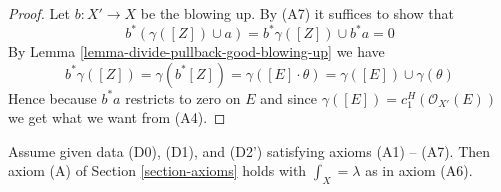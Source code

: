 \begin{proof}
Let $b : X' \to X$ be the blowing up. By (A7) it suffices to show
that
$$
b^*(\gamma([Z]) \cup a) = b^*\gamma([Z]) \cup b^*a = 0
$$
By Lemma \ref{lemma-divide-pullback-good-blowing-up} we have
$$
b^*\gamma([Z]) = \gamma(b^*[Z]) =
\gamma([E] \cdot \theta) =
\gamma([E]) \cup \gamma(\theta)
$$
Hence because $b^*a$ restricts to zero on $E$ and since
$\gamma([E]) = c^H_1(\mathcal{O}_{X'}(E))$ we get what we want from (A4).
\end{proof}

\begin{lemma}
\label{lemma-poincare-duality}
Assume given data (D0), (D1), and (D2') satisfying axioms (A1) -- (A7).
Then axiom (A) of Section \ref{section-axioms} holds with
$\int_X = \lambda$ as in axiom (A6).
\end{lemma}


